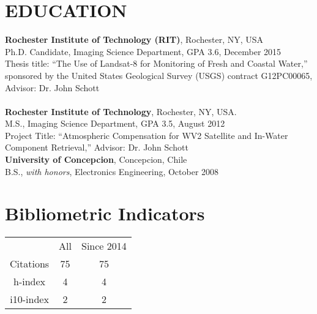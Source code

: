 \documentclass[11pt]{res}
\begin{document}
\begin{resume}
\vspace{-0.3in}                                         
\section{EDUCATION}
\vspace{0.1in}
{\bf Rochester Institute of Technology (RIT)}, Rochester, NY, USA\\
Ph.D. Candidate, Imaging Science Department, GPA 3.6, December 2015\\
Thesis title: ``The Use of Landsat-8 for Monitoring of Fresh and Coastal Water,'' sponsored by the United States Geological Survey (USGS) contract G12PC00065, Advisor: Dr. John Schott\\
\vspace{0.1in}\\
{\bf Rochester Institute of Technology}, Rochester, NY, USA.\\
M.S., Imaging Science Department, GPA 3.5, August 2012\\
Project Title: ``Atmospheric Compensation for WV2 Satellite and In-Water Component Retrieval,'' Advisor: Dr. John Schott
\vspace{0.1in}\\
{\bf University of Concepcion}, Concepcion, Chile \\
B.S., {\it with honors}, Electronics Engineering, October 2008\\
\vspace{-0.1in}
\section{Bibliometric Indicators}
\begin{tabular}{ccc}
			& All	& Since 2014\\
Citations	& 75	& 75 \\
h-index		& 4		& 4  \\
i10-index	& 2		& 2  \\
\end{tabular}

\vspace{-0.1in}

\end{resume}
\end{document}
